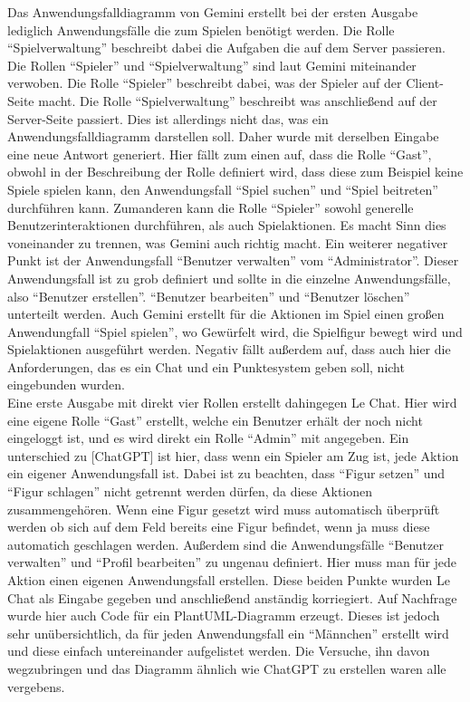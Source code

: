 Das Anwendungsfalldiagramm von Gemini erstellt bei der ersten Ausgabe lediglich Anwendungsfälle die zum Spielen benötigt werden. Die Rolle ``Spielverwaltung'' 
beschreibt dabei die Aufgaben die auf dem Server passieren. Die Rollen ``Spieler'' und ``Spielverwaltung'' sind laut Gemini miteinander verwoben. 
Die Rolle ``Spieler'' beschreibt dabei, was der Spieler auf der Client-Seite macht. Die Rolle ``Spielverwaltung'' beschreibt was anschließend auf der 
Server-Seite passiert. Dies ist allerdings nicht das, was ein Anwendungsfalldiagramm darstellen soll. Daher wurde mit derselben Eingabe eine neue Antwort 
generiert. Hier fällt zum einen auf, dass die Rolle ``Gast'', obwohl in der Beschreibung der Rolle definiert wird, dass diese zum Beispiel keine Spiele 
spielen kann, den Anwendungsfall ``Spiel suchen'' und ``Spiel beitreten'' durchführen kann. Zumanderen kann die Rolle ``Spieler'' sowohl generelle 
Benutzerinteraktionen durchführen, als auch Spielaktionen. Es macht Sinn dies voneinander zu trennen, was Gemini auch richtig macht. Ein weiterer 
negativer Punkt ist der Anwendungsfall ``Benutzer verwalten'' vom ``Administrator''. Dieser Anwendungsfall ist zu grob definiert und sollte in die 
einzelne Anwendungsfälle, also ``Benutzer erstellen''. ``Benutzer bearbeiten'' und ``Benutzer löschen'' unterteilt werden. Auch Gemini erstellt für 
die Aktionen im Spiel einen großen Anwendungfall ``Spiel spielen'', wo Gewürfelt wird, die Spielfigur bewegt wird und Spielaktionen ausgeführt werden.
Negativ fällt außerdem auf, dass auch hier die Anforderungen, das es ein Chat und ein Punktesystem geben soll, nicht eingebunden wurden.\\

Eine erste Ausgabe mit direkt vier Rollen erstellt dahingegen Le Chat. Hier wird eine eigene Rolle ``Gast'' erstellt, welche ein Benutzer erhält der noch nicht eingeloggt ist, und 
es wird direkt ein Rolle ``Admin'' mit angegeben. Ein unterschied zu [ChatGPT] ist hier, dass wenn ein Spieler am Zug ist, jede Aktion ein eigener Anwendungsfall
ist. Dabei ist zu beachten, dass ``Figur setzen'' und ``Figur schlagen'' nicht getrennt werden dürfen, da diese Aktionen zusammengehören. Wenn eine Figur gesetzt 
wird muss automatisch überprüft werden ob sich auf dem Feld bereits eine Figur befindet, wenn ja muss diese automatich geschlagen werden. Außerdem sind die 
Anwendungsfälle ``Benutzer verwalten'' und ``Profil bearbeiten'' zu ungenau definiert. Hier muss man für jede Aktion einen eigenen Anwendungsfall erstellen. Diese beiden Punkte wurden 
Le Chat als Eingabe gegeben und anschließend anständig korriegiert. Auf Nachfrage wurde hier auch Code für ein PlantUML-Diagramm erzeugt. Dieses ist jedoch sehr
unübersichtlich, da für jeden Anwendungsfall ein ``Männchen'' erstellt wird und diese einfach untereinander aufgelistet werden. Die Versuche, ihn davon wegzubringen 
und das Diagramm ähnlich wie ChatGPT zu erstellen waren alle vergebens.\\

